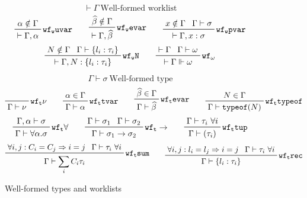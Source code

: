 \documentclass[letterpaper]{article}
\newcommand{\utv}{\alpha}             %
\newcommand{\etv}{\widehat{\beta}}    %
\begin{document}
\begin{figure}
\begin{tabular}{l c l l l}
  \end{tabular}
  $$ \boxed{\vdash\Gamma}\ \textrm{Well-formed worklist} $$
  $$ \prftree[r]{$\mathtt{wf_w uvar}$}
             {\prfassumption{\utv\notin\Gamma}}
             {\vdash\Gamma, \utv}\qquad
     \prftree[r]{$\mathtt{wf_w evar}$}
             {\prfassumption{\etv\notin\Gamma}}
             {\vdash\Gamma, \etv}\qquad
     \prftree[r]{$\mathtt{wf_w pvar}$}
             {\prfassumption{x\notin\Gamma}}{\prfassumption{\Gamma\vdash\sigma}}
             {\vdash\Gamma, x:\sigma} $$
  $$ \prftree[r]{$\mathtt{wf_w N}$}
             {\prfassumption{N\notin\Gamma}}{\prfassumption{\Gamma\vdash\{l_i:\tau_i\}}}
             {\vdash\Gamma, N:\{l_i:\tau_i\}}\qquad
     \prftree[r]{$\mathtt{wf_\omega}$}
             {\prfassumption{\vdash\Gamma}}{\prfassumption{\Gamma\vdash\omega}}
             {\vdash\Gamma\Vdash\omega} $$

  $$ \boxed{\Gamma\vdash\sigma}\ \textrm{Well-formed type}  $$
  $$ \prfbyaxiom{$\mathtt{wf_t \nu}$}{\Gamma\vdash\nu}\qquad
     \prftree[r]{$\mathtt{wf_t tvar}$}
             {\prfassumption{\utv\in\Gamma}}
             {\Gamma\vdash\utv}\qquad
     \prftree[r]{$\mathtt{wf_t evar}$}
             {\prfassumption{\etv\in\Gamma}}
             {\Gamma\vdash\etv}\qquad
     \prftree[r]{$\mathtt{wf_t typeof}$}
             {\prfassumption{N\in\Gamma}}
             {\Gamma\vdash\texttt{typeof}(N)} $$
  $$ \prftree[r]{$\mathtt{wf_t \forall}$}
             {\prfassumption{\Gamma,\utv\vdash\sigma}}
             {\Gamma\vdash\forall\utv.\sigma}\qquad
     \prftree[r]{$\mathtt{wf_t \rightarrow}$}
             {\prfassumption{\Gamma\vdash\sigma_1}}{\prfassumption{\Gamma\vdash\sigma_2}}
             {\Gamma\vdash\sigma_1\rightarrow\sigma_2}\qquad
     \prftree[r]{$\mathtt{wf_t tup}$}
             {\prfassumption{\Gamma\vdash\tau_i\ \forall i}}
             {\Gamma\vdash(\tau_i)} $$
  $$ \prftree[r]{$\mathtt{wf_t sum}$}
             {\prfassumption{\forall i,j:C_i=C_j\Rightarrow i=j}}
             {\prfassumption{\Gamma\vdash\tau_i\ \forall i}}
             {\Gamma\vdash\sum_i C_i\tau_i}\qquad
     \prftree[r]{$\mathtt{wf_t rec}$}
             {\prfassumption{\forall i,j:l_i=l_j\Rightarrow i=j}}
             {\prfassumption{\Gamma\vdash\tau_i\ \forall i}}
             {\Gamma\vdash\{l_i:\tau_i\}} $$
  \caption{Well-formed types and worklists}
  \label{f:defs:wf:types:worklists}
\end{figure}
\end{document}
